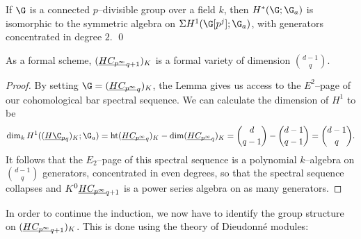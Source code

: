 \begin{lemma}
If $\G$ is a connected $p$--divisible group over a field $k$, then $H^*(\G; \G_a)$ is isomorphic to the symmetric algebra on $\Susp H^1(\G[p^j]; \G_a)$, with generators concentrated in degree $2$. \qed
\end{lemma}

\begin{corollary}
As a formal scheme, $(\underline{\smash{HC_{p^\infty}}}_{q+1})_K$ is a formal variety of dimension $\binom{d-1}{q}$.
\end{corollary}
\begin{proof}
By setting $\G = (\OS{HC_{p^\infty}}{q})_K$, the Lemma gives us access to the $E^2$--page of our cohomological bar spectral sequence.  We can calculate the dimension of $H^1$ to be \[\dim_k H^1((\OS{H\C_p}{q})_K; \G_a) = \height (\OS{HC_{p^\infty}}{q})_K - \dim (\OS{HC_{p^\infty}}{q})_K = \binom{d}{q-1} - \binom{d-1}{q-1} = \binom{d-1}{q}.\]  It follows that the $E_2$--page of this spectral sequence is a polynomial $k$--algebra on $\binom{d-1}{q}$ generators, concentrated in even degrees, so that the spectral sequence collapses and $K^0 \underline{\smash{HC_{p^\infty}}}_{q+1}$ is a power series algebra on as many generators.
\end{proof}

In order to continue the induction, we now have to identify the group structure on $(\underline{\smash{HC_{p^\infty}}}_{q+1})_K$.  This is done using the theory of Dieudonn\'e modules:

